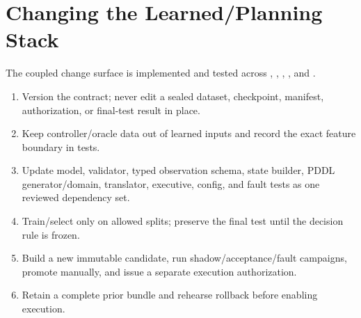 \section{Changing the Learned/Planning Stack}

The coupled change surface is implemented and tested across
,
,
,
, and
.

\begin{procedurebox}
\begin{enumerate}
  \item Version the contract; never edit a sealed dataset, checkpoint, manifest,
        authorization, or final-test result in place.
  \item Keep controller/oracle data out of learned inputs and record the exact
        feature boundary in tests.
  \item Update model, validator, typed observation schema, state builder, PDDL
        generator/domain, translator, executive, config, and fault tests as one
        reviewed dependency set.
  \item Train/select only on allowed splits; preserve the final test until the
        decision rule is frozen.
  \item Build a new immutable candidate, run shadow/acceptance/fault campaigns,
        promote manually, and issue a separate execution authorization.
  \item Retain a complete prior bundle and rehearse rollback before enabling
        execution.
\end{enumerate}
\end{procedurebox}

